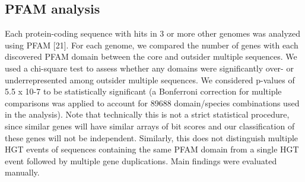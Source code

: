 \subsection{PFAM analysis} Each protein-coding sequence with hits in 3 or more
other genomes was analyzed using PFAM [21]. For each genome, we compared the
number of genes with each discovered PFAM domain between the core and outsider
multiple sequences. We used a chi-square test to assess whether any domains
were significantly over- or underrepresented among outsider multiple sequences.
We considered p-values of 5.5 x 10-7 to be statistically significant (a
Bonferroni correction for multiple comparisons was applied to account for 89688
domain/species combinations used in the analysis). Note that technically this
is not a strict statistical procedure, since similar genes will have similar
arrays of bit scores and our classification of these genes will not be
independent. Similarly, this does not distinguish multiple HGT events of
sequences containing the same PFAM domain from a single HGT event followed by
multiple gene duplications. Main findings were evaluated manually.
